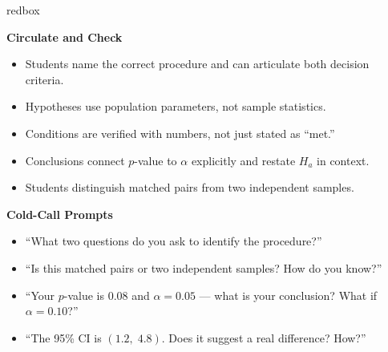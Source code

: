 \documentclass[10pt]{article}
\begin{document}
\begin{skillbox}{redbox}
\begin{minipage}[t]{0.48\linewidth}
    \textbf{Circulate and Check}
    \begin{itemize}
        \item Students name the correct procedure and can articulate both decision criteria.
        \item Hypotheses use population parameters, not sample statistics.
        \item Conditions are verified with numbers, not just stated as ``met.''
        \item Conclusions connect $p$-value to $\alpha$ explicitly and restate $H_a$ in context.
        \item Students distinguish matched pairs from two independent samples.
    \end{itemize}
\end{minipage}
\hfill
\begin{minipage}[t]{0.48\linewidth}
    \textbf{Cold-Call Prompts}
    \begin{itemize}
        \item ``What two questions do you ask to identify the procedure?''
        \item ``Is this matched pairs or two independent samples? How do you know?''
        \item ``Your $p$-value is 0.08 and $\alpha=0.05$ --- what is your conclusion?
              What if $\alpha=0.10$?''
        \item ``The 95\% CI is $(1.2,\; 4.8)$. Does it suggest a real difference? How?''
    \end{itemize}
\end{minipage}
\end{skillbox}
\end{document}
